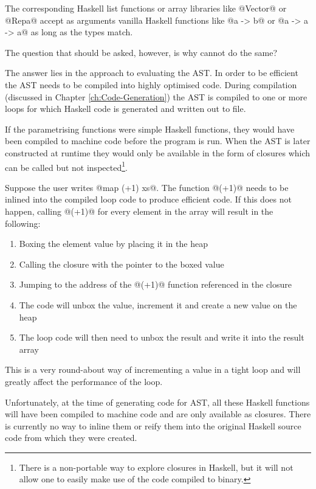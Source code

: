 \documentclass[preamble.tex]{subfiles}
\begin{document}
The corresponding Haskell list functions or array libraries like @Vector@ or @Repa@ \cite{KCL+10} accept as arguments vanilla Haskell functions like @a -> b@ or @a -> a -> a@ as long as the types match.

The question that should be asked, however, is why cannot \LiveFusion do the same?

The answer lies in the approach to evaluating the AST. In order to be efficient the AST needs to be compiled into highly optimised code. During compilation (discussed in Chapter \ref{ch:Code-Generation}) the AST is compiled to one or more loops for which Haskell code is generated and written out to file.

If the parametrising functions were simple Haskell functions, they would have been compiled to machine code before the program is run. When the AST is later constructed at runtime they would only be available in the form of closures which can be called but not inspected\footnote{There is a non-portable way to explore closures in Haskell, but it will not allow one to easily make use of the code compiled to binary.}.

Suppose the user writes @map (+1) xs@. The function @(+1)@ needs to be inlined into the compiled loop code to produce efficient code. If this does not happen, calling @(+1)@ for every element in the array will result in the following:

\begin{enumerate}
\item Boxing the element value by placing it in the heap
\item Calling the closure with the pointer to the boxed value
\item Jumping to the address of the @(+1)@ function referenced in the closure
\item The code will unbox the value, increment it and create a new value on the heap
\item The loop code will then need to unbox the result and write it into the result array
\end{enumerate}

This is a very round-about way of incrementing a value in a tight loop and will greatly affect the performance of the loop.

Unfortunately, at the time of generating code for AST, all these Haskell functions will have been compiled to machine code and are only available as closures. There is currently no way to inline them or reify them into the original Haskell source code from which they were created.
\end{document}
